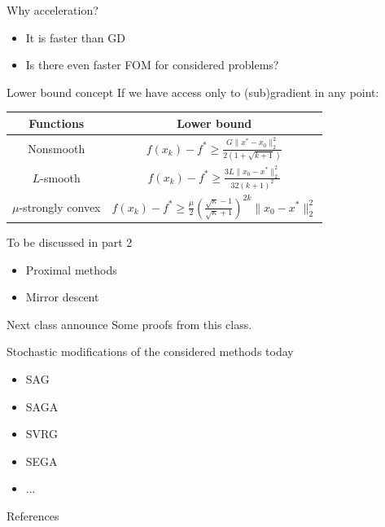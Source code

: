 \documentclass{beamer}
\begin{document}
\begin{frame}{Why acceleration?}
\begin{itemize}
\item It is faster than GD
\item Is there even faster FOM for considered problems?
\end{itemize}
\end{frame}

\begin{frame}{Lower bound concept}
If we have access only to (sub)gradient in any point:
 
\begin{table}
\centering
\begin{tabular}{|c|c|}
\hline
Functions & Lower bound\\
\hline
Nonsmooth & $f(x_k) - f^* \geq \frac{G\|x^* - x_0\|_2^2}{2(1 + \sqrt{k+1})}$\\
\hline
$L$-smooth & $f(x_k) - f^* \geq \frac{3L \|x_0 - x^*\|_2^2}{32(k+1)^2}$\\
\hline
$\mu$-strongly convex & $f(x_k) - f^* \geq \frac{\mu}{2}\left(\frac{\sqrt{\kappa} - 1}{\sqrt{\kappa} + 1} \right)^{2k} \|x_0 - x^*\|_2^2$\\
\hline
\end{tabular}
\end{table}
\end{frame}

\begin{frame}{To be discussed in part 2}
\begin{itemize}
\item Proximal methods
\item Mirror descent
\end{itemize}
\end{frame}

\begin{frame}{Next class announce}
Some proofs from this class.

Stochastic modifications of the considered methods today
\begin{itemize}
\item SAG
\item SAGA
\item SVRG
\item SEGA
\item ...
\end{itemize}
\end{frame}

\begin{frame}[allowframebreaks]{References}

\nocite{nesterov1983method}\nocite{beck2017first}
\nocite{polyak1964some} \nocite{o2015adaptive}\nocite{nemirovsky1983problem} \nocite{su2014differential}


\end{frame}
\end{document}
